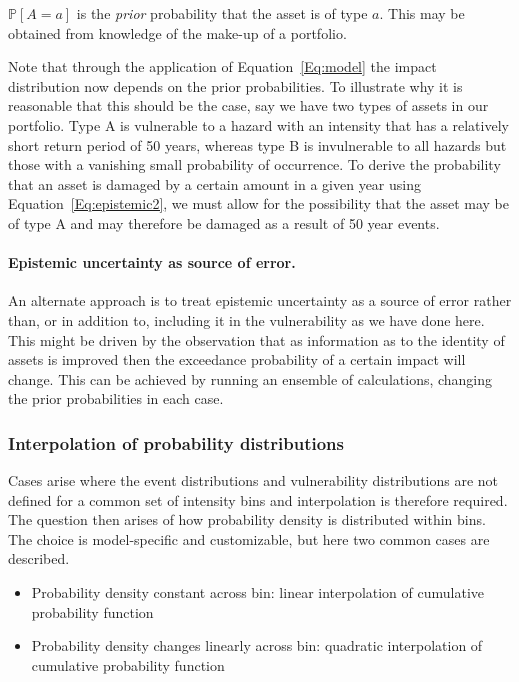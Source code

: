 \documentclass[a4paper,11pt]{extarticle} %
\theoremstyle{definition}
\begin{document}
$\mathbb{P}[A = a]$ is the \emph{prior} probability that the asset is of type $a$. This may be obtained from knowledge of the make-up of a portfolio.

Note that through the application of Equation~\ref{Eq:model} the impact distribution now depends on the prior probabilities. To illustrate why it is reasonable that this should be the case, say we have two types of assets in our portfolio. Type A is vulnerable to a hazard with an intensity that has a relatively short return period of 50 years, whereas type B is invulnerable to all hazards but those with a vanishing small probability of occurrence. To derive the probability that an asset is damaged by a certain amount in a given year using Equation~\ref{Eq:epistemic2}, we must allow for the possibility that the asset may be of type A and may therefore be damaged as a result of 50 year events.

\paragraph{Epistemic uncertainty as source of error.} An alternate approach is to treat epistemic uncertainty as a source of error rather than, or in addition to, including it in the vulnerability as we have done here. This might be driven by the observation that as information as to the identity of assets is improved then the exceedance probability of a certain impact will change. This can be achieved by running an ensemble of calculations, changing the prior probabilities in each case.

\subsubsection{Interpolation of probability distributions}
Cases arise where the event distributions and vulnerability distributions are not defined for a common set of intensity bins and interpolation is therefore required. The question then arises of how probability density is distributed within bins. The choice is model-specific and customizable, but here two common cases are described.

\begin{itemize}
    \item Probability density constant across bin: linear interpolation of cumulative probability function
    \item Probability density changes linearly across bin: quadratic interpolation of cumulative probability function
\end{itemize}
\end{document}

